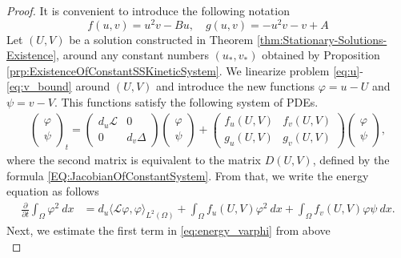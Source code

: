 \documentclass[12pt, a4paper]{article}
\theoremstyle{break}
\theoremstyle{break}
\theoremstyle{break}
\theoremstyle{break}
\theoremstyle{break}
\theoremstyle{break}
\theoremstyle{break}
\begin{document}
\begin{proof}
    It is convenient to introduce the following notation
    \begin{equation}
        \label{eq:non_linearities}
        f(u, v) = u^2v - Bu, \quad g(u,v) = -u^2v - v + A
    \end{equation}
    Let $(U, V)$ be a solution constructed in Theorem \ref{thm:Stationary-Solutions-Existence}, around any constant numbers $(u_*, v_*)$ obtained by Proposition \ref{prp:ExistenceOfConstantSSKineticSystem}. We linearize problem \eqref{eq:u}-\eqref{eq:v_bound} around $(U, V)$ and introduce the new functions $\varphi = u - U$ and $\psi = v - V$. This functions satisfy the following system of PDEs.
    \begin{align*}
        \begin{pmatrix}
            \varphi \\ \psi
        \end{pmatrix}_t
        =
        \begin{pmatrix}
            d_u \mathcal{L} & 0 \\ 0 & d_v \Delta
        \end{pmatrix}
        \begin{pmatrix}
            \varphi \\ \psi
        \end{pmatrix}
        +
        \begin{pmatrix}
            f_u(U,V) & f_v(U,V) \\ g_u(U,V) & g_v(U,V)
        \end{pmatrix}
        \begin{pmatrix}
            \varphi \\ \psi
        \end{pmatrix},
    \end{align*}
    where the second matrix is equivalent to the matrix $D(U, V)$, defined by the formula \eqref{EQ:JacobianOfConstantSystem}. From that, we write the energy equation as follows
    \begin{align}
        \label{eq:energy_varphi}
        \frac{\partial}{\partial t} \int_\Omega \varphi^2\:dx 
        &=
        d_u \langle \mathcal{L}\varphi, \varphi \rangle_{L^2(\Omega)} +  \int_\Omega f_u(U,V) \varphi^2 \:dx + \int_\Omega f_v(U,V) \varphi \psi \:dx.
    \end{align}
    Next, we estimate the first term in \eqref{eq:energy_varphi} from above
    \begin{equation}
        \label{eq:energy_varphi_1st_term}

\end{equation}
\end{proof}
\end{document}
